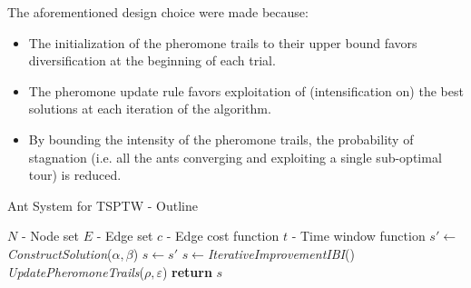 \begin{homeworkProblem}
The aforementioned design choice were made because:

\begin{itemize}
    \item The initialization of the pheromone trails to their upper bound favors diversification at the beginning of each trial.
    \item The pheromone update rule favors exploitation of (intensification on) the best solutions at each iteration of the algorithm.
    \item By bounding the intensity of the pheromone trails, the probability of stagnation (i.e. all the ants converging and exploiting a single sub-optimal tour) is reduced.
  \end{itemize}
  

\begin{algorithm}[!h]
  \caption{\maxmin Ant System for TSPTW - Outline}\label{maxmintsptw}
  \begin{algorithmic}[1]
    \Require $N$ - Node set
    \Require $E$ - Edge set 
    \Require $c$ - Edge cost function
    \Require $t$ - Time window function
        \State $s' \gets$ \emph{ConstructSolution}($\alpha,\beta$)
          \State $s \gets s' $
        \EndIf 
      \EndFor
      \State $s \gets$\emph{IterativeImprovementIBI}()
      \State \emph{UpdatePheromoneTrails}($\rho,\varepsilon$)
    \EndWhile
    \State \textbf{return} $s$
    \State
  \EndProcedure
\end{algorithmic}
\end{algorithm}

\begin{center}
  
\begin{minipage}{.45\textwidth}
\centering
{}
\end{minipage}
\end{center}
\end{homeworkProblem}
